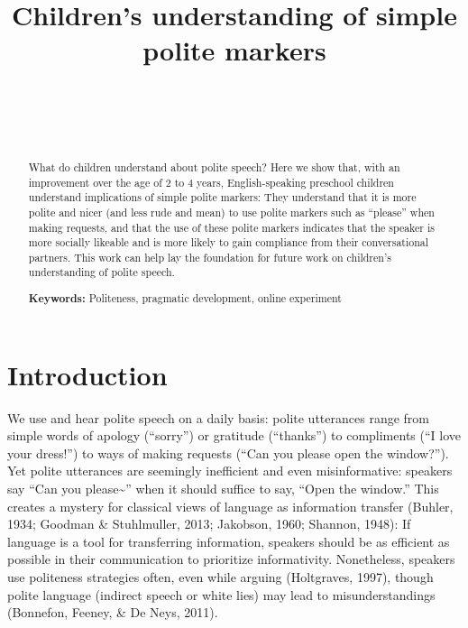 \documentclass[10pt, letterpaper]{article}
\title{Children's understanding of simple polite markers}
\author{{\large \bf } \\ \texttt{} \\  \\}
\begin{document}
\maketitle

\begin{abstract}
What do children understand about polite speech? Here we show that, with
an improvement over the age of 2 to 4 years, English-speaking preschool
children understand implications of simple polite markers: They
understand that it is more polite and nicer (and less rude and mean) to
use polite markers such as ``please'' when making requests, and that the
use of these polite markers indicates that the speaker is more socially
likeable and is more likely to gain compliance from their conversational
partners. This work can help lay the foundation for future work on
children's understanding of polite speech.

\textbf{Keywords:}
Politeness, pragmatic development, online experiment
\end{abstract}

\section{Introduction}\label{introduction}

We use and hear polite speech on a daily basis: polite utterances range
from simple words of apology (``sorry'') or gratitude (``thanks'') to
compliments (``I love your dress!'') to ways of making requests (``Can
you please open the window?''). Yet polite utterances are seemingly
inefficient and even misinformative: speakers say ``Can you
please\textasciitilde{}'' when it should suffice to say, ``Open the
window.'' This creates a mystery for classical views of language as
information transfer (Buhler, 1934; Goodman \& Stuhlmuller, 2013;
Jakobson, 1960; Shannon, 1948): If language is a tool for transferring
information, speakers should be as efficient as possible in their
communication to prioritize informativity. Nonetheless, speakers use
politeness strategies often, even while arguing (Holtgraves, 1997),
though polite language (indirect speech or white lies) may lead to
misunderstandings (Bonnefon, Feeney, \& De Neys, 2011).
\end{document}
